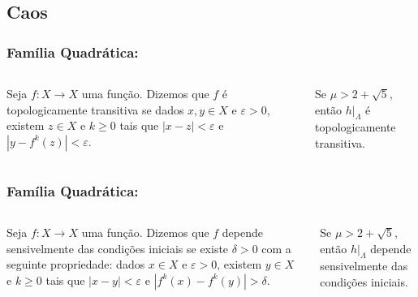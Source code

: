 \subsection{Caos}

\begin{frame}
\vspace{5pt}
\frametitle{Família Quadrática: \subsecname}
\begin{columns}
\column{\dimexpr\paperwidth-15pt}

\begin{definition}
Seja $f: X \to X$ uma função. Dizemos que $f$ é topologicamente transitiva se dados $x, y \in X$ e $\varepsilon > 0$,  existem $z \in X$ e $k \geq 0$ tais que $|x - z| < \varepsilon$ e $|y - f^k(z)| < \varepsilon$.
\end{definition} 

\vspace{10pt}

\begin{proposition}
Se $\mu > 2 + \sqrt{5}$, então $h|_\Lambda$ é topologicamente transitiva.
\end{proposition}

\end{columns}
\end{frame}


\begin{frame}
\vspace{5pt}
\frametitle{Família Quadrática: \subsecname}
\begin{columns}
\column{\dimexpr\paperwidth-15pt}

\begin{definition}
Seja $f: X \to X$ uma função. Dizemos que $f$ depende sensivelmente das condições iniciais se existe $\delta > 0$ com a seguinte propriedade: dados $x \in X$ e $\varepsilon > 0$, existem $y \in X$ e $k \geq 0$ tais que $|x - y| < \varepsilon$ e $|f^k(x) - f^k(y)| > \delta$.
\end{definition}

\vspace{10pt}

\begin{proposition}
Se $\mu > 2 + \sqrt{5}$, então $h|_\Lambda$ depende sensivelmente das condições iniciais.
\end{proposition}

\end{columns}
\end{frame}

